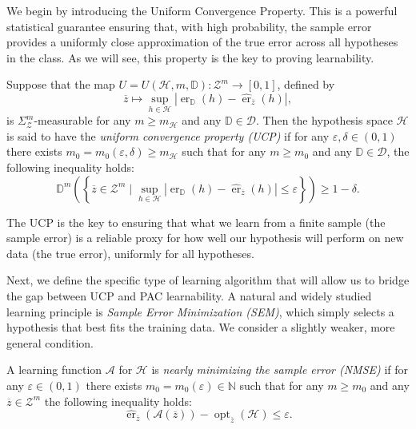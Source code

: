 We begin by introducing the Uniform Convergence Property. This is a powerful statistical guarantee ensuring that, with high probability, the sample error provides a uniformly close approximation of the true error across all hypotheses in the class. As we will see, this property is the key to proving learnability.

\begin{definition}
    \label{def:ucp}
    Suppose that the map $U = U(\mathcal{H}, m, \mathbb{D}): \mathcal{Z}^m \to [0, 1]$, defined by
    \[
        \overline{z} \mapsto \sup_{h \in \mathcal{H}} |\operatorname{er}_{\mathbb{D}}(h) - \hat{\operatorname{er}}_{\overline{z}}(h)|,
    \]
    is $\Sigma_{\mathcal{Z}}^m$-measurable for any $m \ge m_{\mathcal{H}}$ and any $\mathbb{D} \in \mathcal{D}$. Then the hypothesis space $\mathcal{H}$ is said to have the \emph{uniform convergence property (UCP)} if for any $\varepsilon, \delta \in (0,1)$ there exists $m_0 = m_0(\varepsilon, \delta) \ge m_{\mathcal{H}}$ such that for any $m \ge m_0$ and any $\mathbb{D} \in \mathcal{D}$, the following inequality holds:
    \[
        \mathbb{D}^m \left( \left\{ \overline{z} \in \mathcal{Z}^m \mid \sup_{h \in \mathcal{H}} |\operatorname{er}_{\mathbb{D}}(h) - \hat{\operatorname{er}}_{\overline{z}}(h)| \le \varepsilon \right\} \right) \ge 1 - \delta.
    \]
\end{definition}

The UCP is the key to ensuring that what we learn from a finite sample (the sample error) is a reliable proxy for how well our hypothesis will perform on new data (the true error), uniformly for all hypotheses.

Next, we define the specific type of learning algorithm that will allow us to bridge the gap between UCP and PAC learnability. A natural and widely studied learning principle is \emph{Sample Error Minimization (SEM)}, which simply selects a hypothesis that best fits the training data. We consider a slightly weaker, more general condition.

\begin{definition}
    \label{def:nmse}
    A learning function $\mathcal{A}$ for $\mathcal{H}$ is \emph{nearly minimizing the sample error (NMSE)} if for any $\varepsilon \in (0,1)$ there exists $m_0 = m_0(\varepsilon) \in \mathbb{N}$ such that for any $m \ge m_0$ and any $\overline{z} \in \mathcal{Z}^m$ the following inequality holds:
    \[
        \hat{\operatorname{er}}_{\overline{z}}(\mathcal{A}(\overline{z})) - \operatorname{opt}_{\overline{z}}(\mathcal{H}) \le \varepsilon.
    \]
\end{definition}

